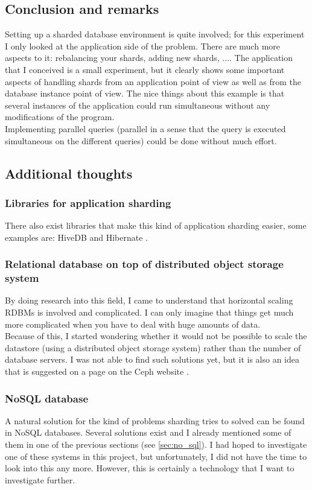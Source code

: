 \documentclass[12pt]{report}
\begin{document}
\subsection{Conclusion and remarks}
Setting up a sharded database environment is quite involved; for this experiment I only
looked at the application side of the problem. There are much more
aspects to it: rebalancing your shards, adding new shards, ....
The application that I conceived is a small experiment, but it clearly
shows some important aspects of handling shards from an application
point of view as well as from the database instance point of view.
The nice things about this example is that several instances of the
application could run simultaneous without any modifications of the
program.\\
Implementing parallel queries (parallel in a sense that the query is
executed simultaneous on the different queries) could be done without
much effort.

\subsection{Additional thoughts}
\subsubsection{Libraries for application sharding}
There also exist libraries that make this kind
of application sharding easier, some examples are: HiveDB
\cite{hivedb} and Hibernate \cite{hibernate_tenants}.

\subsubsection{Relational database on top of distributed object
  storage system} 
By doing research into this field, I came to understand that
horizontal scaling RDBMs is involved and complicated. I can only
imagine that things get much more complicated when you have to deal
with huge amounts of data.\\
Because of this, I started wondering whether it would not be possible
to scale the datastore (using a distributed object storage system)
rather than the number of database servers. 
I was not able to find such solutions yet, but it is also an idea that
is suggested on a page on the Ceph website
\cite{ceph_more_than_an_object_store}.

\subsubsection{NoSQL database}
A natural solution for the kind of problems sharding tries to solved
can be found in NoSQL databases. Several solutions exist and I
already mentioned some of them in one of the previous sections
(see \cref{sec:no_sql}).
I had hoped to investigate one of these systems in this project, but
unfortunately, I did not have the time to look into this any
more. However, this is certainly a technology that I want to 
investigate further. 
\end{document}
